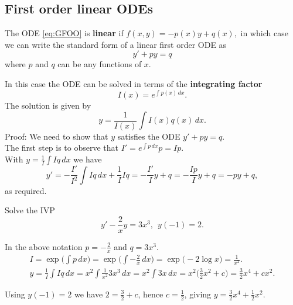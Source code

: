 \subsection{First order linear ODEs}
The ODE \eqref{eq:GFOO} is \textbf{linear} if $f(x,y)=-p(x)y+q(x),$ in which case we can write the standard form of a linear first order ODE as \[y'+py=q\] where $p$ and $q$ can be any functions of $x$.

In this case the ODE can be solved in terms of the \textbf{integrating factor} \[I(x)=e^{\int p(x)\,dx}.\] The solution is given by
\[y=\frac{1}{I(x)}\int I(x)q(x)\, dx.\]
Proof:
We need to show that $y$ satisfies the ODE $y'+py=q.$\\ 

The first step is to observe that $I'=e^{\int p\,dx}p=Ip.$\\

With $y=\frac{1}{I}\int Iq\,dx$ we have \[y'=-\frac{I'}{I^2}\int Iq\,dx+\frac{1}{I}Iq =-\frac{I'}{I}y+q=-\frac{Ip}{I}y+q=-py+q,\]
as required.\\

\begin{example}
    Solve the IVP \[y'-\frac{2}{x}y=3x^3, \ \ y(-1)=2.\]

    In the above notation $p=-\frac{2}{x}$ and $q=3x^3.$
    \begin{equation*}
        \begin{gathered}
            I=\exp\bigg(\int p\,dx\bigg)=\exp\bigg(\int -\frac{2}{x}\,dx\bigg) =\exp\bigg(-2\log x\bigg)=\frac{1}{x^2}. \\
            y=\frac{1}{I}\int Iq\,dx=x^2\int \frac{1}{x^2}3x^3\,dx =x^2\int 3x\,dx=x^2\bigg(\frac{3}{2}x^2+c\bigg) =\frac{3}{2}x^4+cx^2.
        \end{gathered} 
    \end{equation*}

    Using $y(-1)=2$ we have $2=\frac{3}{2}+c$, hence $c=\frac{1}{2}$, giving $y=\frac{3}{2}x^4+\frac{1}{2}x^2.$
\end{example}

\newpage

